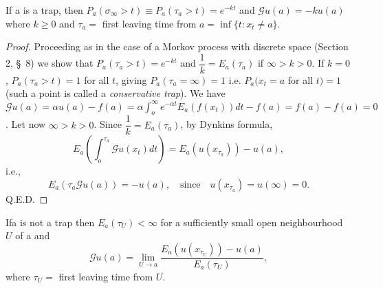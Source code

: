 \begin{thm}\label{chap6-sec2-thm3}%
If a is a trap, then $P_a (\sigma_\infty > t) \equiv P_a (\tau_a >
t)= e^{-kt}$ and $\mathscr{G}u(a)=-k u(a)$ where $k \geq 0$ and
$\tau_a =$ first leaving time from $a=\inf \{t : x_t \neq a \}$. 
\end{thm}

\begin{proof}
Proceeding as in the case of a Morkov process with discrete space
  (Section 2, \S\ 8) we show that $P_a (\tau_a > t)= e^{- kt}$ and
  $\dfrac{1}{k}= E_a (\tau_a)$ if $\infty > k >0$. If $k=0$,
  $P_a(\tau_a > t)=1$ for all $t$, giving $P_a(\tau_a = \infty)= 1$
  i.e. $P_a (x_t=a$ for all $t) =1$ (such a point is called a
  \textit{conservative trap}). We have $ \mathscr{G} u(a)= \alpha u(a)-
  f(a) = \alpha \int^\infty_o e^{- \alpha t} E_a (f(x_t ))dt-
  f(a)=f(a) -f(a)=0 $. Let now $\infty > k > 0$. Since
  $\dfrac{1}{k}=E_a (\tau_a)$, by Dynkins formula, 
  $$
  E_a \left(\int^{\tau_a}_o \mathscr{G} u(x_t) dt \right)= E_a (u(x_{\tau_a})) -
  u(a),
$$
i.e.,
$$
E_a (\tau_a \mathscr{G} u(a)) = - u(a), \quad
  \text{since}\quad 
  u(x_{\tau_a}) = u(\infty)=0.
  $$
Q.E.D.
\end{proof}

\begin{thm}[Dynkin]\label{chap6-sec2-thm4}%
  If\pageoriginale a is not a trap then $E_a (\tau_U) < \infty $ for a sufficiently
  small open neighbourhood $U$ of a and  
  $$
  \mathscr{G} u(a) = \lim_{U \rightarrow a} \frac{E_a( u(x_{\tau_U}))
    - u(a)}{ E_a (\tau_U)}, 
  $$
  where $\tau_U = $ first leaving time from $U$.
\end{thm}


